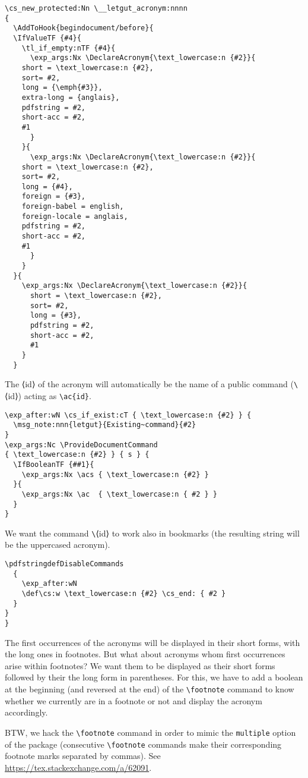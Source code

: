 \documentclass{letgut}
\begin{document}
\begin{lstlisting}
\cs_new_protected:Nn \__letgut_acronym:nnnn
{
  \AddToHook{begindocument/before}{
  \IfValueTF {#4}{
    \tl_if_empty:nTF {#4}{
      \exp_args:Nx \DeclareAcronym{\text_lowercase:n {#2}}{
	short = \text_lowercase:n {#2},
	sort= #2,
	long = {\emph{#3}},
	extra-long = {anglais},
	pdfstring = #2,
	short-acc = #2,
	#1
      }
    }{
      \exp_args:Nx \DeclareAcronym{\text_lowercase:n {#2}}{
	short = \text_lowercase:n {#2},
	sort= #2,
	long = {#4},
	foreign = {#3},
	foreign-babel = english,
	foreign-locale = anglais,
	pdfstring = #2,
	short-acc = #2,
	#1
      }
    }
  }{
    \exp_args:Nx \DeclareAcronym{\text_lowercase:n {#2}}{
      short = \text_lowercase:n {#2},
      sort= #2,
      long = {#3},
      pdfstring = #2,
      short-acc = #2,
      #1
    }
  }
\end{lstlisting}
The ⟨id⟩ of the acronym will automatically be the name of a public command
(\lstinline+\+​⟨id⟩) acting as \lstinline+\ac{id}+.
\begin{lstlisting}
\exp_after:wN \cs_if_exist:cT { \text_lowercase:n {#2} } {
  \msg_note:nnn{letgut}{Existing~command}{#2}
}
\exp_args:Nc \ProvideDocumentCommand
{ \text_lowercase:n {#2} } { s } {
  \IfBooleanTF {##1}{
    \exp_args:Nx \acs { \text_lowercase:n {#2} }
  }{
    \exp_args:Nx \ac  { \text_lowercase:n { #2 } }
  }
}
\end{lstlisting}
We want the command \lstinline+\+​⟨id⟩ to work also in bookmarks (the resulting string will
be the uppercased acronym).
\begin{lstlisting}
\pdfstringdefDisableCommands
  {
    \exp_after:wN
    \def\cs:w \text_lowercase:n {#2} \cs_end: { #2 }
  }
}
}
\end{lstlisting}

The first occurrences of the acronyms will be displayed in their short forms,
with the long ones in footnotes. But what about acronyms whom first occurrences
arise within footnotes? We want them to be displayed as their short forms
followed by their the long form in parentheses. For this, we have to add
a boolean at the beginning (and reversed at the end) of the \lstinline+\footnote+ command
to know whether we currently are in a footnote or not and display the acronym
accordingly.

BTW, we hack the \lstinline+\footnote+ command in order to mimic the \lstinline+multiple+ option of
the  package (consecutive \lstinline+\footnote+ commands make their
corresponding footnote marks separated by commas). See
\url{https://tex.stackexchange.com/a/62091}.
\end{document}
